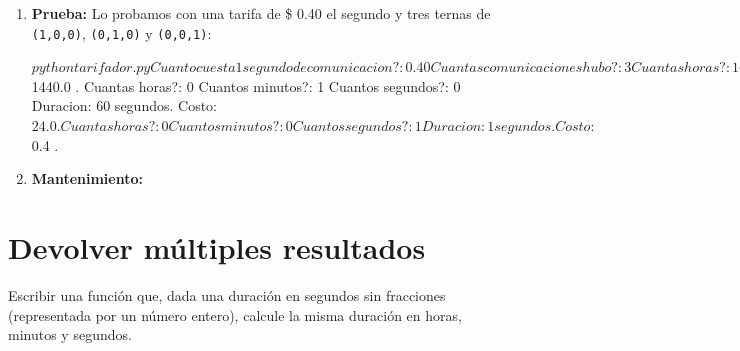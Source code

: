 \begin{solucion}
\begin{enumerate}
\begin{codigo}{\label{tarifador} tarifador.py}{Programa para calcular el costo
    de uso de un teléfono.}
\end{codigo}

\item {\bf Prueba:} Lo probamos con una tarifa de \$ 0.40 el segundo y tres
ternas de \lstinline!(1,0,0)!, \lstinline!(0,1,0)! y \lstinline!(0,0,1)!:

\begin{codigo-nohl-sn}
$ python tarifador.py
Cuanto cuesta 1 segundo de comunicacion?: 0.40
Cuantas comunicaciones hubo?: 3
Cuantas horas?: 1
Cuantos minutos?: 0
Cuantos segundos?: 0
Duracion: 3600 segundos. Costo: $ 1440.0 .
Cuantas horas?: 0
Cuantos minutos?: 1
Cuantos segundos?: 0
Duracion: 60 segundos. Costo: $ 24.0 .
Cuantas horas?: 0
Cuantos minutos?: 0
Cuantos segundos?: 1
Duracion: 1 segundos. Costo: $ 0.4 .
\end{codigo-nohl-sn}

\item {\bf Mantenimiento:}

\end{enumerate}
\end{solucion}

\section{Devolver múltiples resultados}
\label{fun:multiple_return}

\begin{problemac}
Escribir una función que, dada una duración en segundos sin fracciones
(representada por un número entero), calcule la misma duración en horas,
minutos y segundos.
\end{problemac}

